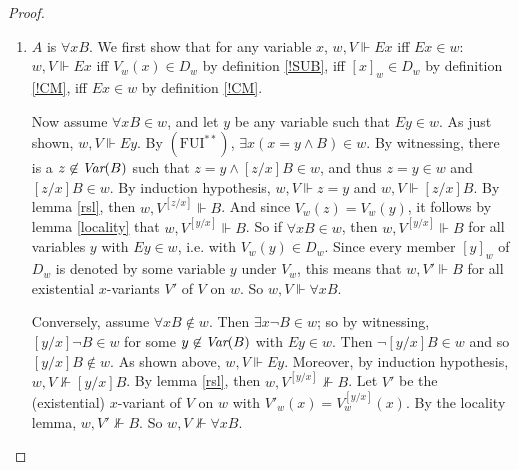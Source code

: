 \documentclass[11pt]{woarticle}
\newcommand{\cmnt}[1]{\iffalse #1 \fi}
\theoremstyle{break}
\theoremstyle{nonumberplain}
\newcommand{\SAT}{\Vdash}
\newcommand{\1}{\;\,|\;\,}
\newcommand{\var}{\emph{Var}}
\renewcommand{\t}[1]{\ensuremath{\langle #1  \makebox[.2ex]{}\rangle}}
\newcommand{\T}[1]{\ensuremath{(\mathrm{ #1})}}
\begin{document}
\begin{proof}
\begin{enumerate}
  \item $A$ is $\forall x B$.\; We first show that for any variable
    $x$, $w,V \SAT Ex$ iff $Ex \in w$: $w,V \SAT Ex$ iff $V_w(x) \in
    D_w$ by definition \ref{!SUB}, iff $[x]_w \in D_w$ by definition
    \ref{!CM}, iff $Ex \in w$ by definition \ref{!CM}.

    Now assume $\forall x B \in w$, and let $y$ be any variable such
    that $Ey \in w$. As just shown, $w,V \SAT Ey$. By \T{FUI^{**}},
    $\exists x(x\!=\!y \land B) \in w$. By witnessing, there is a $z
    \not\in \var(B)$ such that $z\!=\!y \land [z/x]B \in w$, and thus
    $z\!=\!y \in w$ and $[z/x]B \in w$. By induction hypothesis, $w,V
    \SAT z\!=\!y$ and $w,V \SAT [z/x]B$. By lemma \ref{rsl}, then
    $w,V^{[z/x]} \SAT B$. And since $V_w(z) = V_w(y)$, it follows by
    lemma \ref{locality} that $w,V^{[y/x]} \SAT B$. So if $\forall x B
    \in w$, then $w,V^{[y/x]} \SAT B$ for all variables $y$ with $Ey
    \in w$, i.e. with $V_w(y) \in D_w$. Since every member $[y]_w$ of
    $D_w$ is denoted by some variable $y$ under $V_w$, this means that
    $w,V' \SAT B$ for all existential $x$-variants $V'$ of $V$ on
    $w$. So $w,V \SAT \forall x B$.%
    \cmnt{%
      (The last steps are only valid if $V$ is the original
      interpretation function, not if it is an image: with images,
      members of $D_w$ can be unnamed.)%
    } %

    Conversely, assume $\forall x B \not\in w$. Then $\exists x \neg B
    \in w$; so by witnessing, $[y/x]\neg B \in w$ for some $y \not\in
    \var(B)$ with $Ey \in w$. Then $\neg [y/x]B \in w$ and so $[y/x] B
    \not\in w$. As shown above, $w,V \SAT Ey$. Moreover, by induction
    hypothesis, $w,V \not\SAT [y/x]B$. By lemma \ref{rsl}, then
    $w,V^{[y/x]} \not\SAT B$. Let $V'$ be the (existential)
    $x$-variant of $V$ on $w$ with $V'_w(x) = V^{[y/x]}_w(x)$. By the
    locality lemma, $w,V' \not\SAT B$. So $w,V \not\SAT \forall x B$.

    \cmnt{

      \T{FUI^{**}} here gives us a kind of witnessing for universal
      formulas, which amounts to something like \T{FUI}: whenever
      $\forall x B \in w$, then for each $[y]_w \in D_w$ there is a
      $z$ s.t. $z\!=\!y \in w$ and $[z/x]B \in w$. Compare
      \T{FUI_s}, which ensures that whenever $\forall x B \in w$ then
      for each $[y]_w \in D_w$, $\t{y:x}B \in w$ and so by
      substitutional witnessing, for each $[y]_w \in D_w$ there is a
      $z$ s.t. $z\!=\!y \in w$ and $[z/x]B \in w$.

}
\end{enumerate}
\end{proof}
\end{document}
